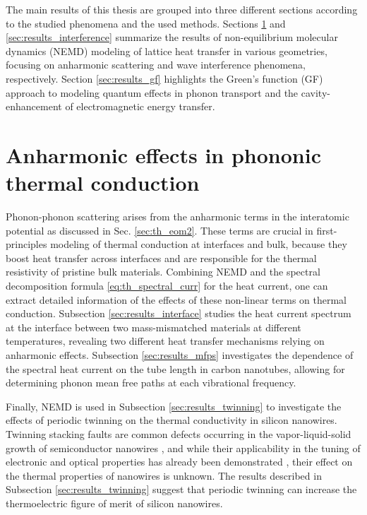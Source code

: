
\label{chap:results}

The main results of this thesis are grouped into three different sections according to the studied phenomena and the used methods. Sections \ref{sec:results_anharm} and \ref{sec:results_interference} summarize the results of non-equilibrium molecular dynamics (NEMD) modeling of lattice heat transfer in various geometries, focusing on anharmonic scattering and wave interference phenomena, respectively. Section \ref{sec:results_gf} highlights the Green's function (GF) approach to modeling quantum effects in phonon transport and the cavity-enhancement of electromagnetic energy transfer.

\section{Anharmonic effects in phononic thermal conduction}
\label{sec:results_anharm}

Phonon-phonon scattering arises from the anharmonic terms in the interatomic potential as discussed in Sec. \ref{sec:th_eom2}. These terms are crucial in first-principles modeling of thermal conduction at interfaces and bulk, because they boost heat transfer across interfaces \cite{lyeo06} and are responsible for the thermal resistivity of pristine bulk materials. Combining NEMD and the spectral decomposition formula \eqref{eq:th_spectral_curr} for the heat current, one can extract detailed information of the effects of these non-linear terms on thermal conduction. Subsection \ref{sec:results_interface} studies the heat current spectrum at the interface between two mass-mismatched materials at different temperatures, revealing two different heat transfer mechanisms relying on anharmonic effects. Subsection \ref{sec:results_mfps} investigates the dependence of the spectral heat current on the tube length in carbon nanotubes, allowing for determining phonon mean free paths at each vibrational frequency. 

Finally, NEMD is used in Subsection \ref{sec:results_twinning} to investigate the effects of periodic twinning on the thermal conductivity in silicon nanowires. Twinning stacking faults are common defects occurring in the vapor-liquid-solid growth of semiconductor nanowires \cite{johansson06,xiong06,davidson07,algra08}, and while their applicability in the tuning of electronic \cite{ikonic93b} and optical \cite{ikonic95} properties has already been demonstrated \cite{im14}, their effect on the thermal properties of nanowires is unknown. The results described in Subsection \ref{sec:results_twinning} suggest that periodic twinning can increase the thermoelectric figure of merit of silicon nanowires. 

